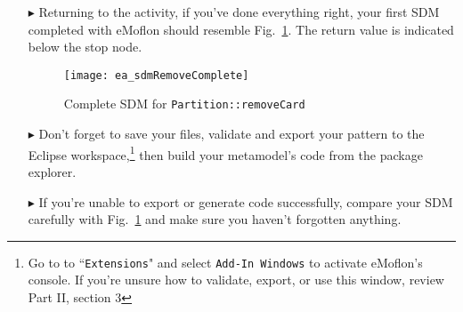 \begin{itemize}
\vspace{0.5cm}

We're nearly done! As you can see, by using several different dialouges, eMoflon employs a simple context-sensitive expression language for specifying required
values. We have intentionally avoided creating a full-blown sub-language, and limit expressions to a few simple types.\footnote{We also do not support nesting
expressions} The philosophy here is to keep things simple and concentrate on what SDMs are good for -- expressing structural changes. Our approach is to
provide a clear and type-safe interface to a general purpose language (Java) and support a simple \emph{fallback} as soon as things get too low-level and
difficult to express as a pattern.

The alternative approach to eMoflon would be to support arbitrary expressions, for example, in a script language like JavaScript or in an appropriate
DSL\footnote{A DSL is a Domain Specific Language: a language designed for a specific task which is usually simpler than a general purpose language like Java and
more suitable for the exact task.} designed for this purpose. In the following SDM implementations, we'll learn the other expression types eMoflon supports,
and how to use them. 

\item[$\blacktriangleright$] Returning to the activity, if you've done everything right, your first SDM completed with eMoflon should resemble
Fig.~\ref{fig:sdm_complete_control_flow}. The return value is indicated below the stop node.


\begin{figure}[htbp]
\begin{center}
  \texttt{[image: ea\_sdmRemoveComplete]}
  \caption{Complete SDM for \texttt{Partition::removeCard}}  
  \label{fig:sdm_complete_control_flow}
\end{center}
\end{figure}

\item[$\blacktriangleright$]  Don't forget to save your files, validate and export your pattern to the Eclipse workspace,\footnote{Go to to
``\texttt{Extensions}" and select \texttt{Add-In Windows} to activate eMoflon's console. If you're unsure how to validate, export, or use this window, review
Part II, section 3} then build your metamodel's code from the package explorer.

\item[$\blacktriangleright$] If you're unable to export or generate code successfully, compare your SDM carefully with Fig.~\ref{fig:sdm_complete_control_flow}
and make sure you haven't forgotten anything.


\end{itemize}
